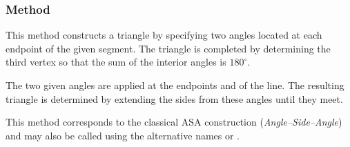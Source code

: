 \vspace{1em}
\begin{minipage}{.5\textwidth}
\begin{center}
\end{center}

\end{minipage}
\begin{minipage}{.5\textwidth}
\begin{tkzexample}
\end{tkzexample}
\end{minipage}

\subsubsection{Method }
\label{ssub:triangle_with_two__angles}

This method constructs a triangle by specifying two angles located at each endpoint of the given segment. The triangle is completed by determining the third vertex so that the sum of the interior angles is $180^\circ$.

\medskip

The two given angles are applied at the endpoints  and  of the line. The resulting triangle is determined by extending the sides from these angles until they meet.

\medskip

This method corresponds to the classical ASA construction (\textit{Angle–Side–Angle}) and may also be called using the alternative names  or .

\vspace{1em}

